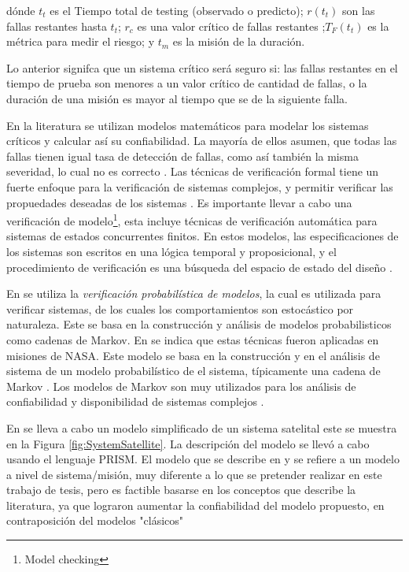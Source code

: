   dónde $t_t$ es el Tiempo total de testing (observado o predicto); $r(t_t)$ son las fallas restantes hasta $t_t$; $r_c$ es una valor crítico de fallas restantes ;$T_F(t_t)$ es la métrica para medir el riesgo; y $t_m$ es la misión de la duración.

  Lo anterior signifca que un sistema crítico será seguro si: las fallas restantes en el tiempo de prueba son menores a un valor crítico de cantidad de fallas, o la duración de una misión es mayor al tiempo que se de la siguiente falla.
  
  En la literatura se utilizan modelos matemáticos para modelar los sistemas críticos y calcular así su confiabilidad. La mayoría de ellos asumen, que todas las fallas tienen igual tasa de detección de fallas, como así también la misma severidad, lo cual no es correcto \cite{Liu14}. Las técnicas de verificación formal tiene un fuerte enfoque para la verificación de sistemas complejos, y permitir verificar las propuedades deseadas de los sistemas \citep{Peng13}. Es importante llevar a cabo una verificación de modelo\footnote{Model checking}, esta incluye técnicas de verificación automática para sistemas de estados concurrentes finitos. En estos modelos, las especificaciones de los sistemas son escritos en una lógica temporal y proposicional, y el procedimiento de verificación es una búsqueda del espacio de estado del diseño \citep{Hoque15}.

  En \cite{Hoque15} se utiliza la \textit{verificación probabilística de modelos}, la cual es utilizada para verificar sistemas, de los cuales los comportamientos son estocástico por naturaleza. Este se basa en la construcción y análisis de modelos probabilisticos como cadenas de Markov. En \cite{Hoque15} se indica que estas técnicas fueron aplicadas en misiones de \ac{NASA}. Este modelo se basa en la construcción y en el análisis de sistema de un  modelo probabilístico de el sistema, típicamente una cadena de Markov \citep{Hoque15}. Los modelos de Markov son muy utilizados para los análisis de confiabilidad y disponibilidad de sistemas complejos \citep{Hoque15}.

  En \cite{Hoque15} se lleva a cabo un modelo simplificado de un sistema satelital este se muestra en la Figura \ref{fig:SystemSatellite}. La descripción del modelo se llevó a cabo usando el lenguaje PRISM. El modelo que se describe en \cite{Hoque15} y \cite{Peng13} se refiere a un modelo a nivel de sistema/misión, muy diferente a lo que se pretender realizar en este trabajo de tesis, pero es factible basarse en los conceptos que describe la literatura, ya que lograron aumentar la confiabilidad del modelo propuesto, en contraposición del modelos "clásicos"

